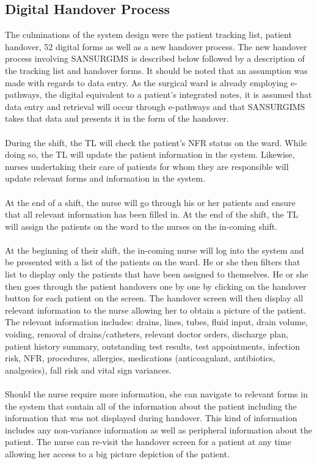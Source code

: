 \subsection{Digital Handover Process}
\label{Digital Handover Process}
The culminations of the system design were the patient tracking list, patient handover, 52 digital forms as well as a new handover process. The new handover process involving SANSURGIMS is described below followed by a description of the tracking list and handover forms. It should be noted that an assumption was made with regards to data entry. As the surgical ward is already employing e-pathways, the digital equivalent to a patient's integrated notes, it is assumed that data entry and retrieval will occur through e-pathways and that SANSURGIMS takes that data and presents it in the form of the handover.
\\ \\
During the shift, the TL will check the patient's NFR status on the ward. While doing so, the TL will update the patient information in the system. Likewise, nurses undertaking their care of patients for whom they are responsible will update relevant forms and information in the system. 
\\ \\
At the end of a shift, the nurse will go through his or her patients and ensure that all relevant information has been filled in. At the end of the shift, the TL will assign the patients on the ward to the nurses on the in-coming shift.
\\ \\
At the beginning of their shift, the in-coming nurse will log into the system and be presented with a list of the patients on the ward. He or she then filters that list to display only the patients that have been assigned to themselves. He or she then goes through the patient handovers one by one by clicking on the handover button for each patient on the screen. The handover screen will then display all relevant information to the nurse allowing her to obtain a picture of the patient. The relevant information includes: drains, lines, tubes, fluid input, drain volume, voiding, removal of drains/catheters, relevant doctor orders, discharge plan, patient history summary, outstanding test results, test appointments, infection risk, NFR, procedures, allergies, medications (anticoagulant, antibiotics, analgesics), fall risk and vital sign variances. 
\\ \\
Should the nurse require more information, she can navigate to relevant forms in the system that contain all of the information about the patient including the information that was not displayed during handover. This kind of information includes any non-variance information as well as peripheral information about the patient. The nurse can re-visit the handover screen for a patient at any time allowing her access to a big picture depiction of the patient.


